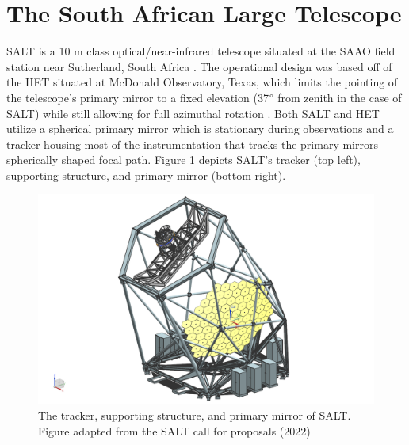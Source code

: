 





\section{The South African Large Telescope} %

\gls{SALT} is a 10 m class optical/near-infrared telescope situated at the \gls{SAAO} field station near Sutherland, South Africa \citep{SALT_optical_design}. The operational design was based off of the \gls{HET} situated at McDonald Observatory, Texas, which limits the pointing of the telescope's primary mirror to a fixed elevation (37$\degree$ from zenith in the case of SALT) while still allowing for full azimuthal rotation \citep{HET}. Both SALT and HET utilize a spherical primary mirror which is stationary during observations and a tracker housing most of the instrumentation that tracks the primary mirrors spherically shaped focal path. Figure \ref{fig:SALT_telescope} depicts \gls{SALT}'s tracker (top left), supporting structure, and primary mirror (bottom right).

\begin{figure}[t]
    \centering
    \includegraphics[width = 15cm]{figures/2_SALT_telescope.png}
    \caption{The tracker, supporting structure, and primary mirror of SALT. Figure adapted from the SALT call for proposals (2022)\protect\footnotemark}
    \label{fig:SALT_telescope}
\end{figure}

